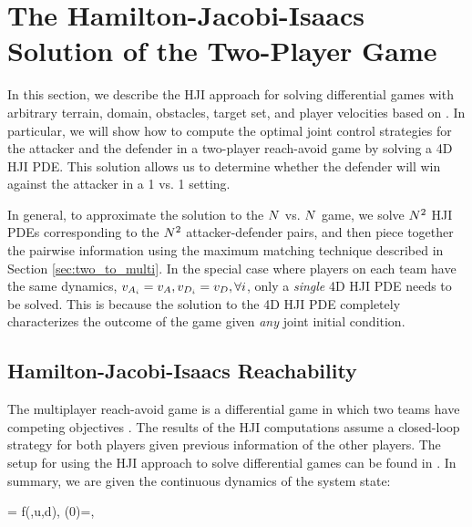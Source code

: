 \section{The Hamilton-Jacobi-Isaacs Solution of the Two-Player Game} \label{sec:solution_hji}
In this section, we describe the HJI approach for solving differential games with arbitrary terrain, domain, obstacles, target set, and player velocities based on \cite{Huang2011,j:mitchell-TAC-2005, LSToolbox}. In particular, we will show how to compute the optimal joint control strategies for the attacker and the defender in a two-player reach-avoid game by solving a 4D HJI PDE. This solution allows us to determine whether the defender will win against the attacker in a 1 vs. 1 setting. 

In general, to approximate the solution to the $N$ vs. $N$ game, we solve $N^2$ HJI PDEs corresponding to the $N^2$ attacker-defender pairs, and then piece together the pairwise information using the maximum matching technique described in Section \ref{sec:two_to_multi}. In the special case where players on each team have the same dynamics, $v_{A_{i}} = v_A, v_{D_{i}} = v_D, \forall i$, only a \textit{single} 4D HJI PDE needs to be solved. This is because the solution to the 4D HJI PDE completely characterizes the outcome of the game given \textit{any} joint initial condition.

\subsection{Hamilton-Jacobi-Isaacs Reachability} \label{subsec:hj_background}
The multiplayer reach-avoid game is a differential game in which two teams have competing objectives \cite{b:basar-olsder-1999}. The results of the HJI computations assume a closed-loop strategy for both players given previous information of the other players. The setup for using the HJI approach to solve differential games can be found in \cite{Huang2011, j:mitchell-TAC-2005, LSToolbox}. In summary, we are given the continuous dynamics of the system state:

\bq
\dxj = f(\xj,u,d), \xj(0)=\xjn,
\eq

